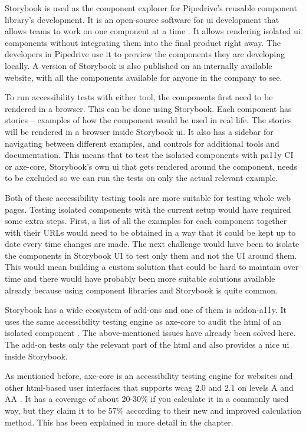 \documentclass{master_thesis}
\begin{document}
Storybook is used as the component explorer for Pipedrive's reusable component library's development. It is an open-source software for \ac{ui} development that allows teams to work on one component at a time \citep{storybook}. It allows rendering isolated \ac{ui} components without integrating them into the final product right away. The developers in Pipedrive use it to preview the components they are developing locally. A version of Storybook is also published on an internally available website, with all the components available for anyone in the company to see.

To run accessibility tests with either tool, the components first need to be rendered in a browser. This can be done using Storybook. Each component has stories – examples of how the component would be used in real life. The stories will be rendered in a browser inside Storybook \ac{ui}. It also has a sidebar for navigating between different examples, and controls for additional tools and documentation.
This means that to test the isolated components with pa11y CI or axe-core, Storybook's own \ac{ui} that gets rendered around the component, needs to be excluded so we can run the tests on only the actual relevant example.

Both of these accessibility testing tools are more suitable for testing whole web pages. Testing isolated components with the current setup would have required some extra steps. First, a list of all the examples for each component together with their URLs would need to be obtained in a way that it could be kept up to date every time changes are made. The next challenge would have been to isolate the components in Storybook UI to test only them and not the UI around them. This would mean building a custom solution that could be hard to maintain over time and there would have probably been more suitable solutions available already because using component libraries and Storybook is quite common.

Storybook has a wide ecosystem of add-ons and one of them is addon-a11y. It uses the same accessibility testing engine as axe-core to audit the \ac{html} of an isolated component \citep{addon-a11y}. The above-mentioned issues have already been solved here. The add-on tests only the relevant part of the \ac{html} and also provides a nice \ac{ui} inside Storybook.

As mentioned before, axe-core is an accessibility testing engine for websites and other \ac{html}-based user interfaces that supports \ac{wcag} 2.0 and 2.1 on levels A and AA \citep{Deque2023}. It has a coverage of about 20-30\% if you calculate it in a commonly used way, but they claim it to be 57\% according to their new and improved calculation method. This has been explained in more detail in the  chapter.
\end{document}
